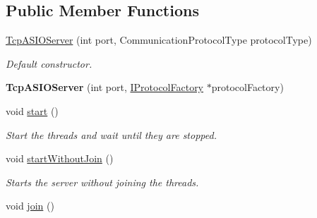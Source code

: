 \subsection*{Public Member Functions}
\begin{DoxyCompactItemize}
\item 
\hyperlink{classmognetwork_1_1_tcp_a_s_i_o_server_a8bdf6097cf8931094d8ee7c5f5fbc4bf}{Tcp\-A\-S\-I\-O\-Server} (int port, Communication\-Protocol\-Type protocol\-Type)
\begin{DoxyCompactList}\small\item\em Default constructor. \end{DoxyCompactList}\item 
\hypertarget{classmognetwork_1_1_tcp_a_s_i_o_server_adea436db7edfd8500d60b4e06c60ea50}{{\bfseries Tcp\-A\-S\-I\-O\-Server} (int port, \hyperlink{classmognetwork_1_1_i_protocol_factory}{I\-Protocol\-Factory} $\ast$protocol\-Factory)}\label{classmognetwork_1_1_tcp_a_s_i_o_server_adea436db7edfd8500d60b4e06c60ea50}

\item 
\hypertarget{classmognetwork_1_1_tcp_a_s_i_o_server_ad6c804597aafd577c41310cdc986c7ff}{void \hyperlink{classmognetwork_1_1_tcp_a_s_i_o_server_ad6c804597aafd577c41310cdc986c7ff}{start} ()}\label{classmognetwork_1_1_tcp_a_s_i_o_server_ad6c804597aafd577c41310cdc986c7ff}

\begin{DoxyCompactList}\small\item\em Start the threads and wait until they are stopped. \end{DoxyCompactList}\item 
\hypertarget{classmognetwork_1_1_tcp_a_s_i_o_server_a6fdaedf488704a3c62ab0a2ada618b9a}{void \hyperlink{classmognetwork_1_1_tcp_a_s_i_o_server_a6fdaedf488704a3c62ab0a2ada618b9a}{start\-Without\-Join} ()}\label{classmognetwork_1_1_tcp_a_s_i_o_server_a6fdaedf488704a3c62ab0a2ada618b9a}

\begin{DoxyCompactList}\small\item\em Starts the server without joining the threads. \end{DoxyCompactList}\item 
\hypertarget{classmognetwork_1_1_tcp_a_s_i_o_server_a10dce29ca785a4f641df52b23402f76c}{void \hyperlink{classmognetwork_1_1_tcp_a_s_i_o_server_a10dce29ca785a4f641df52b23402f76c}{join} ()}\label{classmognetwork_1_1_tcp_a_s_i_o_server_a10dce29ca785a4f641df52b23402f76c}


\end{DoxyCompactItemize}
